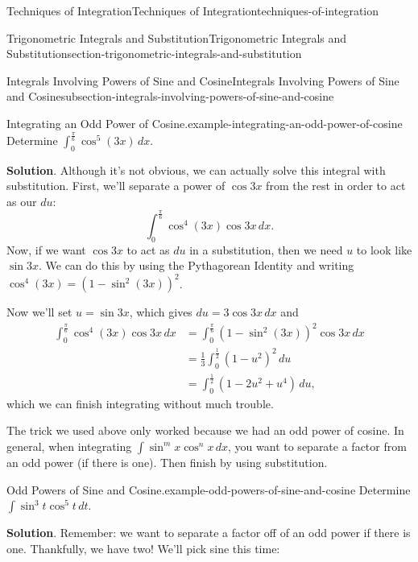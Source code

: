 \documentclass[oneside,10pt,]{book}
\numberwithin{equation}{section}
\begin{document}
\begin{chapterptx}{Techniques of Integration}{}{Techniques of Integration}{}{}{techniques-of-integration}
\begin{sectionptx}{Trigonometric Integrals and Substitution}{}{Trigonometric Integrals and Substitution}{}{}{section-trigonometric-integrals-and-substitution}
\typeout{************************************************}
%
\begin{subsectionptx}{Integrals Involving Powers of Sine and Cosine}{}{Integrals Involving Powers of Sine and Cosine}{}{}{subsection-integrals-involving-powers-of-sine-and-cosine}
\begin{example}{Integrating an Odd Power of Cosine.}{example-integrating-an-odd-power-of-cosine}%
\hypertarget{p-520}{}%
Determine \(\int_{0}^{\frac{\pi}{6}}\cos^{5}(3x)\,dx\).%
\par\smallskip%
\noindent\textbf{Solution}.\hypertarget{solution-114}{}\quad%
\hypertarget{p-521}{}%
Although it's not obvious, we can actually solve this integral with substitution. First, we'll separate a power of \(\cos3x\) from the rest in order to act as our \(du\):%
\begin{equation*}
\int_{0}^{\frac{\pi}{6}}\cos^{4}(3x)\cos3x\,dx.
\end{equation*}
Now, if we want \(\cos3x\) to act as \(du\) in a substitution, then we need \(u\) to look like \(\sin3x\). We can do this by using the Pythagorean Identity and writing \(\cos^{4}(3x) = (1 - \sin^{2}(3x))^{2}\).%
\par
\hypertarget{p-522}{}%
Now we'll set \(u = \sin3x\), which gives \(du = 3\cos3x\,dx\) and%
%
\begin{align*}
\int_{0}^{\frac{\pi}{6}}\cos^{4}(3x)\cos3x\,dx & = \int_{0}^{\frac{\pi}{6}}(1-\sin^{2}(3x))^{2}\cos3x\,dx \\
& = \frac{1}{3}\int_{0}^{\frac{1}{2}}(1 - u^{2})^{2}\,du \\
& = \int_{0}^{\frac{1}{2}}(1 - 2u^{2} + u^{4})\,du, 
\end{align*}
\hypertarget{p-523}{}%
which we can finish integrating without much trouble.%
\end{example}
\hypertarget{p-524}{}%
The trick we used above only worked because we had an odd power of cosine. In general, when integrating \(\int\sin^{m}x\cos^{n}x\,dx\), you want to separate a factor from an odd power (if there is one). Then finish by using substitution.%
\begin{example}{Odd Powers of Sine and Cosine.}{example-odd-powers-of-sine-and-cosine}%
\hypertarget{p-525}{}%
Determine \(\int\sin^{3}t\cos^{5}t\,dt\).%
\par\smallskip%
\noindent\textbf{Solution}.\hypertarget{solution-115}{}\quad%
\hypertarget{p-526}{}%
Remember: we want to separate a factor off of an odd power if there is one. Thankfully, we have two! We'll pick sine this time:%
%
\begin{align*}

\end{align*}
\end{example}
\end{subsectionptx}
\end{sectionptx}
\end{chapterptx}
\end{document}
